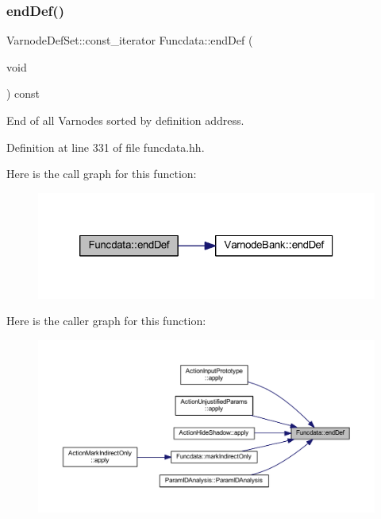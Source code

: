 \subsubsection{\texorpdfstring{endDef()}{endDef()}\hspace{0.1cm}{\footnotesize\ttfamily [1/3]}}
{\footnotesize\ttfamily Varnode\+Def\+Set\+::const\+\_\+iterator Funcdata\+::end\+Def (\begin{DoxyParamCaption}\item[{void}]{ }\end{DoxyParamCaption}) const\hspace{0.3cm}{\ttfamily [inline]}}



End of all Varnodes sorted by definition address. 



Definition at line 331 of file funcdata.\+hh.

Here is the call graph for this function\+:
\nopagebreak
\begin{figure}[H]
\begin{center}
\leavevmode
\includegraphics[width=320pt]{class_funcdata_ad5fba46eb4e585463bafe3461d415fd4_cgraph}
\end{center}
\end{figure}
Here is the caller graph for this function\+:
\nopagebreak
\begin{figure}[H]
\begin{center}
\leavevmode
\includegraphics[width=350pt]{class_funcdata_ad5fba46eb4e585463bafe3461d415fd4_icgraph}
\end{center}
\end{figure}
\mbox{\label{class_funcdata_a5fa192d156e74fef2a22c274b86f3e73}} 
